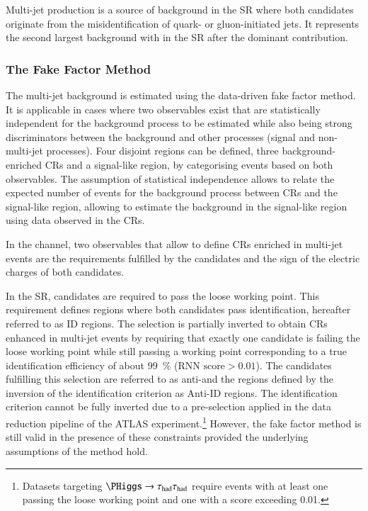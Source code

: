 Multi-jet production is a source of background in the \hadhad SR where both
\tauhadvis candidates originate from the misidentification of quark- or
gluon-initiated jets. It represents the second largest background with
\faketauhadvis in the \hadhad SR after the dominant \ttbarFakes contribution.

\subsubsection{The Fake Factor Method}

The multi-jet background is estimated using the data-driven fake factor
method. It is applicable in cases where two observables exist that are
statistically independent for the background process to be estimated while also
being strong discriminators between the background and other processes (signal
and non-multi-jet processes). Four disjoint regions can be defined, three
background-enriched CRs and a signal-like region, by categorising events based
on both observables. The assumption of statistical independence allows to relate
the expected number of events for the background process between CRs and the
signal-like region, allowing to estimate the background in the signal-like
region using data observed in the CRs.

In the \hadhad channel, two observables that allow to define CRs enriched in
multi-jet events are the \tauid requirements fulfilled by the \tauhadvis
candidates and the sign of the electric charges of both candidates.

In the SR, \tauhadvis candidates are required to pass the loose \tauid working
point. This requirement defines regions where both \tauhadvis candidates pass
identification, hereafter referred to as ID regions. The selection is partially
inverted to obtain CRs enhanced in multi-jet events by requiring that exactly
one \tauhadvis candidate is failing the loose \tauid working point while still
passing a working point corresponding to a true \tauhadvis identification
efficiency of about \SI{99}{\percent} ($\text{RNN score} > 0.01$). The
\tauhadvis candidates fulfilling this selection are referred to as
anti-\tauhadvis and the regions defined by the inversion of the identification
criterion as Anti-ID regions. The identification criterion cannot be fully
inverted due to a pre-selection applied in the data reduction pipeline of the
ATLAS experiment.\footnote{Datasets targeting $\PHiggs \to \hadhad$ require
  events with at least one \tauhadvis passing the loose \tauid working point and
  one \tauhadvis with a \tauid score exceeding 0.01.}  However, the fake factor
method is still valid in the presence of these constraints provided the
underlying assumptions of the method hold.

